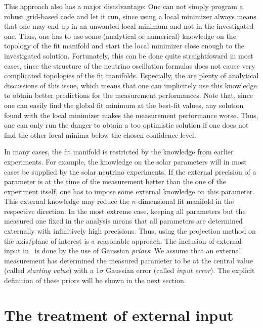 This approach also has a major disadvantage: One can not simply program a robust grid-based code and let it run, since using a local minimizer always means that one may end up in an unwanted local minimum and not in the investigated one. Thus, one has to use some (analytical or numerical) knowledge on the topology of the fit manifold and start the local minimizer close enough to the investigated solution. Fortunately, this can be done quite straightfoward in most cases, since the structure of the neutrino oscillation formulas does not cause very complicated topologies of the fit manifolds. Especially, the are plenty of analytical discussions of this issue, which means that one can implicitely use this knowledge to obtain better predictions for the measurement performances. Note that, since one can easily find the global fit minimum at the best-fit values, any solution found with the local minimizer makes the measurement performance worse. Thus, one can only run the danger to obtain a too optimistic solution if one does not find the other local minima below the chosen confidence level.

  
In many cases, the fit manifold is restricted by the knowledge from earlier experiments. For example, the knowledge on the solar parameters will in most cases be supplied by the solar neutrino experiments. If the external precision of a parameter is at the time of the measurement better than the one of the experiment itself, one has to impose some external knowledge on this parameter. This external knowledge may reduce the $n$-dimensional fit manifold in the respective direction. In the most extreme case, keeping all parameters but the measured one fixed in the analysis means that all parameters are determined externally with infinitively high precisions. Thus, using the projection method on the axis/plane of interest is a reasonable approach. The inclusion of external input in \GLOBES\ is done by the use of Gaussian {\em priors}: We assume that an external measurement has determined the measured parameter to be at the central value (called {\em starting value}) with a $1 \sigma$ Gaussian error (called {\em input error}). The explicit definition of these priors will be shown in the next section.

\section{The treatment of external input}
\label{sec:externalinput}

